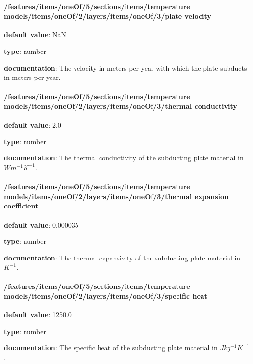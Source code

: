 \begin{itemized}
\end{itemized}\paragraph{/features/items/oneOf/5/sections/items/temperature models/items/oneOf/2/layers/items/oneOf/3/plate velocity} \begin{itemized}
\item {\bf default value}: NaN
\item {\bf type}: number
\item {\bf documentation}: The velocity in meters per year with which the plate subducts in meters per year.
\end{itemized}\paragraph{/features/items/oneOf/5/sections/items/temperature models/items/oneOf/2/layers/items/oneOf/3/thermal conductivity} \begin{itemized}
\item {\bf default value}: 2.0
\item {\bf type}: number
\item {\bf documentation}: The thermal conductivity of the subducting plate material in $W m^{-1} K^{-1}$.
\end{itemized}\paragraph{/features/items/oneOf/5/sections/items/temperature models/items/oneOf/2/layers/items/oneOf/3/thermal expansion coefficient} \begin{itemized}
\item {\bf default value}: 0.000035
\item {\bf type}: number
\item {\bf documentation}: The thermal expansivity of the subducting plate material in $K^{-1}$.
\end{itemized}\paragraph{/features/items/oneOf/5/sections/items/temperature models/items/oneOf/2/layers/items/oneOf/3/specific heat} \begin{itemized}
\item {\bf default value}: 1250.0
\item {\bf type}: number
\item {\bf documentation}: The specific heat of the subducting plate material in $J kg^{-1} K^{-1}$.

\end{itemized}
